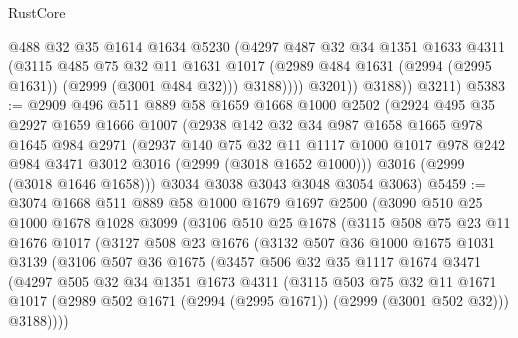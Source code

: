 \begin{lexlean}{RustCore}
\begin{coremodule}
                  @488
                  @32
                  @35
                  @1614
                  @1634
                  @5230
                  (@4297
                    @487
                    @32
                    @34
                    @1351
                    @1633
                    @4311
                    (@3115
                      @485
                      @75
                      @32
                      @11
                      @1631
                      @1017
                      (@2989 @484 @1631 (@2994 (@2995 @1631)) (@2999 (@3001 @484 @32)))
                      @3188))))
              @3201))
          @3188))
      @3211)
@5383 := @2909
    @496
    @511
    @889
    @58
    @1659
    @1668
    @1000
    @2502
    (@2924
      @495
      @35
      @2927
      @1659
      @1666
      @1007
      (@2938
        @142
        @32
        @34
        @987
        @1658
        @1665
        @978
        @1645
        @984
        @2971
        (@2937
          @140
          @75
          @32
          @11
          @1117
          @1000
          @1017
          @978
          @242
          @984
          @3471
          @3012
          @3016
          (@2999 (@3018 @1652 @1000)))
        @3016
        (@2999 (@3018 @1646 @1658)))
      @3034
      @3038
      @3043
      @3048
      @3054
      @3063)
@5459 := @3074
    @1668
    @511
    @889
    @58
    @1000
    @1679
    @1697
    @2500
    (@3090
      @510
      @25
      @1000
      @1678
      @1028
      @3099
      (@3106
        @510
        @25
        @1678
        (@3115
          @508
          @75
          @23
          @11
          @1676
          @1017
          (@3127
            @508
            @23
            @1676
            (@3132
              @507
              @36
              @1000
              @1675
              @1031
              @3139
              (@3106
                @507
                @36
                @1675
                (@3457
                  @506
                  @32
                  @35
                  @1117
                  @1674
                  @3471
                  (@4297
                    @505
                    @32
                    @34
                    @1351
                    @1673
                    @4311
                    (@3115
                      @503
                      @75
                      @32
                      @11
                      @1671
                      @1017
                      (@2989 @502 @1671 (@2994 (@2995 @1671)) (@2999 (@3001 @502 @32)))
                      @3188))))

\end{coremodule}
\end{lexlean}
